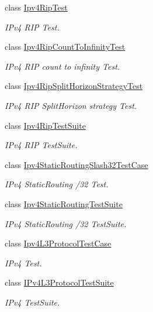 \begin{DoxyCompactItemize}
class \hyperlink{classIpv4RipTest}{Ipv4\+Rip\+Test}
\begin{DoxyCompactList}\small\item\em I\+Pv4 R\+IP Test. \end{DoxyCompactList}\item 
class \hyperlink{classIpv4RipCountToInfinityTest}{Ipv4\+Rip\+Count\+To\+Infinity\+Test}
\begin{DoxyCompactList}\small\item\em I\+Pv4 R\+IP count to infinity Test. \end{DoxyCompactList}\item 
class \hyperlink{classIpv4RipSplitHorizonStrategyTest}{Ipv4\+Rip\+Split\+Horizon\+Strategy\+Test}
\begin{DoxyCompactList}\small\item\em I\+Pv4 R\+IP Split\+Horizon strategy Test. \end{DoxyCompactList}\item 
class \hyperlink{classIpv4RipTestSuite}{Ipv4\+Rip\+Test\+Suite}
\begin{DoxyCompactList}\small\item\em I\+Pv4 R\+IP Test\+Suite. \end{DoxyCompactList}\item 
class \hyperlink{classIpv4StaticRoutingSlash32TestCase}{Ipv4\+Static\+Routing\+Slash32\+Test\+Case}
\begin{DoxyCompactList}\small\item\em I\+Pv4 Static\+Routing /32 Test. \end{DoxyCompactList}\item 
class \hyperlink{classIpv4StaticRoutingTestSuite}{Ipv4\+Static\+Routing\+Test\+Suite}
\begin{DoxyCompactList}\small\item\em I\+Pv4 Static\+Routing /32 Test\+Suite. \end{DoxyCompactList}\item 
class \hyperlink{classIpv4L3ProtocolTestCase}{Ipv4\+L3\+Protocol\+Test\+Case}
\begin{DoxyCompactList}\small\item\em I\+Pv4 Test. \end{DoxyCompactList}\item 
class \hyperlink{classIPv4L3ProtocolTestSuite}{I\+Pv4\+L3\+Protocol\+Test\+Suite}
\begin{DoxyCompactList}\small\item\em I\+Pv4 Test\+Suite. \end{DoxyCompactList}\item 

\end{DoxyCompactItemize}
